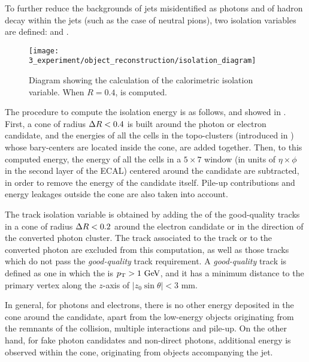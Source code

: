 To further reduce the backgrounds of jets misidentified as photons and of hadron decay within the jets (such as the case of neutral pions), two isolation variables are defined: \etconefo and \ptconetw.

\begin{figure}[ht!]
    \centering
    \texttt{[image: 3\_experiment/object\_reconstruction/isolation\_diagram]}
    \caption{Diagram showing the calculation of the calorimetric isolation variable. When \(R=0.4\), \etconefo is computed.}
    \label{fig:objects:egamma:iso:iso_diagram}
\end{figure}

The procedure to compute the isolation energy \etconefo is as follows, and showed in \Fig{\ref{fig:objects:egamma:iso:iso_diagram}}. First, a cone of radius \(\Delta R<0.4\) is built around the photon or electron candidate, and the energies of all the cells in the topo-clusters (introduced in \Sect{\ref{subsec:objects:egamma:reco}}) whose bary-centers are located inside the cone, are added together. Then, to this computed energy, the energy of all the cells in a \(5\times 7\) window (in units of \(\eta \times \phi\) in the second layer of the \ac{ECAL}) centered around the candidate are subtracted, in order to remove the energy of the candidate itself. Pile-up contributions and energy leakages outside the cone are also taken into account.

The track isolation variable \ptconetw is obtained by adding the \pt of the good-quality tracks in a cone of radius \(\Delta R<0.2\) around the electron candidate or in the direction of the converted photon cluster.
The track associated to the track or to the converted photon are excluded from this computation, as well as those tracks which do not pass the \textit{good-quality} track requirement. A \textit{good-quality} track is defined as one in which the \pt is \(p_{\text{T}}>1~\text{GeV}\), and it has a minimum distance to the primary vertex along the \(z\)-axis of \(|z_0 \sin \theta| < 3\) mm.

In general, for photons and electrons, there is no other energy deposited in the cone around the candidate, apart from the low-energy objects originating from the remnants of the collision, multiple interactions and pile-up. On the other hand, for fake photon candidates and non-direct photons, additional energy is observed within the cone, originating from objects accompanying the jet.

